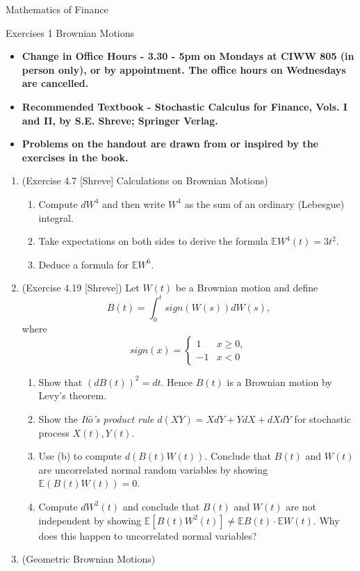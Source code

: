 \documentclass{article}
\begin{document}
{\bf \centerline{\Large Mathematics of Finance }}
\vskip0.25cm
{\bf \centerline{\Large Exercises 1 \quad Brownian Motions}}
\vskip0.25cm

\begin{itemize}
\item {\bf Change in Office Hours - 3.30 - 5pm on Mondays at CIWW 805 (in person only), or by appointment. The office hours on Wednesdays are cancelled.}
\item {\bf Recommended Textbook - Stochastic Calculus for Finance, Vols. I and II, by S.E. Shreve; Springer Verlag. }
\item {\bf Problems on the handout are drawn from or inspired by the exercises in the book.} 
\end{itemize}

\begin{enumerate}
\item (Exercise 4.7 [Shreve] Calculations on Brownian Motions)
\begin{enumerate}
\item Compute $dW^4$ and then write $W^4$ as the sum of an ordinary (Lebesgue) integral.
\item Take expectations on both sides to derive the formula $\mathbb EW^4(t)=3t^2$.
\item Deduce a formula for $\mathbb EW^6$.
\end{enumerate}
\item (Exercise 4.19 [Shreve]) Let $W(t)$ be a Brownian motion and define
\[
B(t)=\int_0^t sign(W(s))dW(s),
\]
where 
\[
sign(x)=\begin{cases} 1 & x\geq0, \\ -1 & x<0 \end{cases}
\]
\begin{enumerate}
\item Show that $(dB(t))^2=dt$. Hence $B(t)$ is a Brownian motion by Levy's theorem.
\item Show the \emph{It$\hat o$'s product rule} $d(XY)=XdY+YdX+dXdY$ for stochastic process $X(t), Y(t)$. 
\item Use (b) to compute $d(B(t)W(t))$. Conclude that $B(t)$ and $W(t)$ are uncorrelated normal random variables by showing $\mathbb E(B(t)W(t))=0$. 
\item Compute $dW^2(t)$ and conclude that $B(t)$ and $W(t)$ are not independent by showing $\mathbb E[B(t)W^2(t)] \neq \mathbb EB(t)\cdot \mathbb EW(t)$. Why does this happen to uncorrelated normal variables?
\end{enumerate}
\item (Geometric Brownian Motions)

\end{enumerate}
\end{document}
